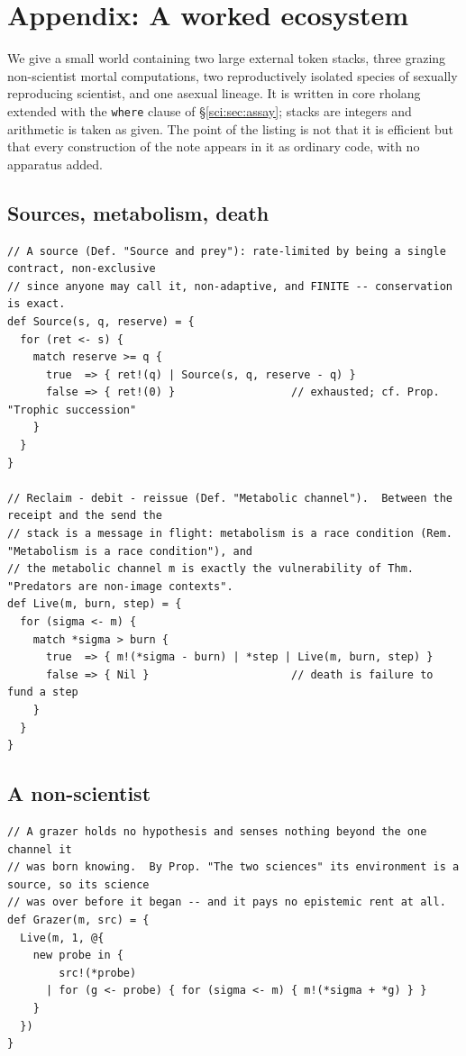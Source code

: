 \section{Appendix: A worked ecosystem}\label{sci:S19}
\label{sci:app:eco}

We give a small world containing two large external token stacks, three grazing non-scientist mortal
computations, two reproductively isolated species of sexually reproducing scientist, and one asexual
lineage. It is written in core rholang extended with the \texttt{where} clause of \S\ref{sci:sec:assay};
stacks are integers and arithmetic is taken as given. The point of the listing is not that it is
efficient but that every construction of the note appears in it as ordinary code, with no apparatus
added.

\subsection{Sources, metabolism, death}\label{sci:S19.1}

\begin{lstlisting}
// A source (Def. "Source and prey"): rate-limited by being a single contract, non-exclusive
// since anyone may call it, non-adaptive, and FINITE -- conservation is exact.
def Source(s, q, reserve) = {
  for (ret <- s) {
    match reserve >= q {
      true  => { ret!(q) | Source(s, q, reserve - q) }
      false => { ret!(0) }                  // exhausted; cf. Prop. "Trophic succession"
    }
  }
}

// Reclaim - debit - reissue (Def. "Metabolic channel").  Between the receipt and the send the
// stack is a message in flight: metabolism is a race condition (Rem. "Metabolism is a race condition"), and
// the metabolic channel m is exactly the vulnerability of Thm. "Predators are non-image contexts".
def Live(m, burn, step) = {
  for (sigma <- m) {
    match *sigma > burn {
      true  => { m!(*sigma - burn) | *step | Live(m, burn, step) }
      false => { Nil }                      // death is failure to fund a step
    }
  }
}
\end{lstlisting}

\subsection{A non-scientist}\label{sci:S19.2}

\begin{lstlisting}
// A grazer holds no hypothesis and senses nothing beyond the one channel it
// was born knowing.  By Prop. "The two sciences" its environment is a source, so its science
// was over before it began -- and it pays no epistemic rent at all.
def Grazer(m, src) = {
  Live(m, 1, @{
    new probe in {
        src!(*probe)
      | for (g <- probe) { for (sigma <- m) { m!(*sigma + *g) } }
    }
  })
}
\end{lstlisting}

